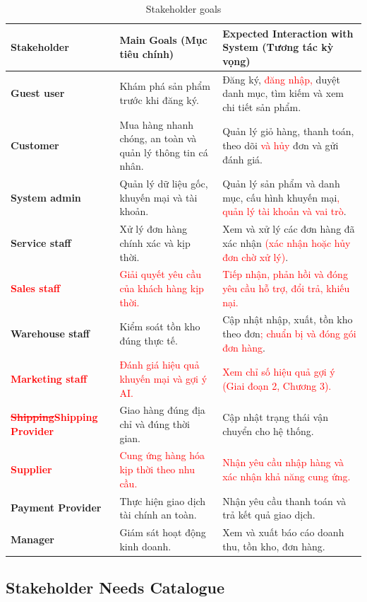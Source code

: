 \documentclass[12pt,a4paper,oneside]{report}
\newif\ifmark \marktrue
\newcommand{\chg}[1]{\ifmark\textcolor{red}{#1}\else #1\fi}
\newcommand{\del}[1]{\ifmark\textcolor{red}{\sout{#1}}\fi}
\begin{document}
\begin{longtable}{p{3.4cm}p{5.6cm}p{7cm}}
\caption{Stakeholder goals}\\
\toprule
\textbf{Stakeholder} & \textbf{Main Goals (Mục tiêu chính)} & \textbf{Expected Interaction with System (Tương tác kỳ vọng)} \\
\midrule
\endhead
\bottomrule
\endlastfoot
\textbf{Guest user} & Khám phá sản phẩm trước khi đăng ký. & Đăng ký, \chg{đăng nhập, }duyệt danh mục, tìm kiếm và xem chi tiết sản phẩm. \\
\textbf{Customer} & Mua hàng nhanh chóng, an toàn và quản lý thông tin cá nhân. & Quản lý giỏ hàng, thanh toán, theo dõi \chg{và hủy }đơn và gửi đánh giá. \\
\textbf{System admin} & Quản lý dữ liệu gốc, khuyến mại và tài khoản. & Quản lý sản phẩm và danh mục, cấu hình khuyến mại\chg{, quản lý tài khoản và vai trò}. \\
\textbf{Service staff} & Xử lý đơn hàng chính xác và kịp thời. & Xem và xử lý các đơn hàng đã xác nhận\chg{ (xác nhận hoặc hủy đơn chờ xử lý)}. \\
\chg{\textbf{Sales staff}} & \chg{Giải quyết yêu cầu của khách hàng kịp thời.} & \chg{Tiếp nhận, phản hồi và đóng yêu cầu hỗ trợ, đổi trả, khiếu nại.} \\
\textbf{Warehouse staff} & Kiểm soát tồn kho đúng thực tế. & Cập nhật nhập, xuất, tồn kho theo đơn\chg{; chuẩn bị và đóng gói đơn hàng}. \\
\chg{\textbf{Marketing staff}} & \chg{Đánh giá hiệu quả khuyến mại và gợi ý AI.} & \chg{Xem chỉ số hiệu quả gợi ý (Giai đoạn 2, Chương 3).} \\
\textbf{\del{Shipping}\chg{Shipping Provider}} & Giao hàng đúng địa chỉ và đúng thời gian. & Cập nhật trạng thái vận chuyển cho hệ thống. \\
\chg{\textbf{Supplier}} & \chg{Cung ứng hàng hóa kịp thời theo nhu cầu.} & \chg{Nhận yêu cầu nhập hàng và xác nhận khả năng cung ứng.} \\
\textbf{Payment Provider} & Thực hiện giao dịch tài chính an toàn. & Nhận yêu cầu thanh toán và trả kết quả giao dịch. \\
\textbf{Manager} & Giám sát hoạt động kinh doanh. & Xem và xuất báo cáo doanh thu, tồn kho, đơn hàng. \\
\end{longtable}

\subsection{Stakeholder Needs Catalogue}
\end{document}
